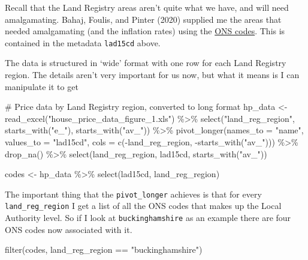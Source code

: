 \documentclass[
  letterpaper,
]{book}
\newenvironment{Shaded}{\begin{snugshade}}{\end{snugshade}}
\newcommand{\AttributeTok}[1]{\textcolor[rgb]{0.40,0.45,0.13}{#1}}
\newcommand{\CommentTok}[1]{\textcolor[rgb]{0.37,0.37,0.37}{#1}}
\newcommand{\FunctionTok}[1]{\textcolor[rgb]{0.28,0.35,0.67}{#1}}
\newcommand{\NormalTok}[1]{\textcolor[rgb]{0.00,0.23,0.31}{#1}}
\newcommand{\OtherTok}[1]{\textcolor[rgb]{0.00,0.23,0.31}{#1}}
\newcommand{\SpecialCharTok}[1]{\textcolor[rgb]{0.37,0.37,0.37}{#1}}
\newcommand{\StringTok}[1]{\textcolor[rgb]{0.13,0.47,0.30}{#1}}
\begin{document}
Recall that the Land Registry areas aren't quite what we have, and will
need amalgamating. Bahaj, Foulis, and Pinter (2020) supplied me the
areas that needed amalgamating (and the inflation rates) using the
\href{https://en.wikipedia.org/wiki/ONS_coding_system}{ONS codes}. This
is contained in the metadata \texttt{lad15cd} above.

The data is structured in `wide' format with one row for each Land
Registry region. The details aren't very important for us now, but what
it means is I can manipulate it to get

\begin{Shaded}
\begin{Highlighting}[]
\CommentTok{\# Price data by Land Registry region, converted to long format}
\NormalTok{hp\_data }\OtherTok{\textless{}{-}} \FunctionTok{read\_excel}\NormalTok{(}\StringTok{"house\_price\_data\_figure\_1.xls"}\NormalTok{)  }\SpecialCharTok{\%\textgreater{}\%} 
  \FunctionTok{select}\NormalTok{(}\StringTok{"land\_reg\_region"}\NormalTok{, }\FunctionTok{starts\_with}\NormalTok{(}\StringTok{"e\_"}\NormalTok{), }\FunctionTok{starts\_with}\NormalTok{(}\StringTok{"av\_"}\NormalTok{)) }\SpecialCharTok{\%\textgreater{}\%} 
  \FunctionTok{pivot\_longer}\NormalTok{(}\AttributeTok{names\_to  =} \StringTok{"name"}\NormalTok{, }
               \AttributeTok{values\_to =} \StringTok{"lad15cd"}\NormalTok{, }
               \AttributeTok{cols      =} \FunctionTok{c}\NormalTok{(}\SpecialCharTok{{-}}\NormalTok{land\_reg\_region, }\SpecialCharTok{{-}}\FunctionTok{starts\_with}\NormalTok{(}\StringTok{"av\_"}\NormalTok{))) }\SpecialCharTok{\%\textgreater{}\%} 
  \FunctionTok{drop\_na}\NormalTok{() }\SpecialCharTok{\%\textgreater{}\%}
  \FunctionTok{select}\NormalTok{(land\_reg\_region, lad15cd, }\FunctionTok{starts\_with}\NormalTok{(}\StringTok{"av\_"}\NormalTok{)) }

\NormalTok{codes }\OtherTok{\textless{}{-}}\NormalTok{ hp\_data }\SpecialCharTok{\%\textgreater{}\%} 
  \FunctionTok{select}\NormalTok{(lad15cd, land\_reg\_region) }
\end{Highlighting}
\end{Shaded}

The important thing that the \texttt{pivot\_longer} achieves is that for
every \texttt{land\_reg\_region} I get a list of all the ONS codes that
makes up the Local Authority level. So if I look at
\texttt{buckinghamshire} as an example there are four ONS codes now
associated with it.

\begin{Shaded}
\begin{Highlighting}[]
\FunctionTok{filter}\NormalTok{(codes, land\_reg\_region }\SpecialCharTok{==} \StringTok{"buckinghamshire"}\NormalTok{)}
\end{Highlighting}
\end{Shaded}
\end{document}
